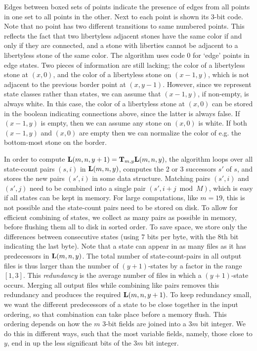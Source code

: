 \documentclass{article}
\begin{document}
Edges between boxed sets of points indicate the presence of edges from all
points in one set to all points in the other.
Next to each point is shown its 3-bit code. Note that no point
has two different transitions to same numbered points. 
This reflects the fact that two libertyless adjacent stones have the same
color if and only if they are connected, and a stone with liberties cannot
be adjacent to a libertyless stone of the same color.
The algorithm uses code 0 for `edge' points in edge states.
Two pieces of information are still lacking; the color of a libertyless
stone at $(x,0)$, and the color of a libertyless stone on $(x-1,y)$, which
is not adjacent to the previous border point at $(x,y-1)$.
However, since we represent state classes rather than states, we can
assume that $(x-1,y)$, if non-empty, is always white.
In this case, the color of a libertyless stone at $(x,0)$ can be stored
in the boolean indicating connections above, since the latter is always false.
If $(x-1,y)$ is empty, then we can assume any stone on $(x,0)$ is white.
If both $(x-1,y)$ and $(x,0)$ are empty then we can normalize
the color of e.g. the bottom-most stone on the border.

In order to compute $\mathbf{L}(m,n,y+1) = \mathbf{T}_{m,y} \mathbf{L}(m,n,y)$,
the algorithm loops over all state-count pairs $(s,i)$ in $\mathbf{L}(m,n,y)$,
computes the 2 or 3 successors $s'$ of $s$, and stores the new pairs
$(s',i)$ in some data structure.
Matching pairs $(s',i)$ and $(s',j)$ need to be combined into a single
pair $(s',i+j \bmod M)$, which is easy if all states can be kept in memory.
For large computations, like $m=19$, this is not possible and the
state-count pairs need to be stored on disk. To allow for efficient combining
of states, we collect as many pairs as possible in memory, before flushing
them all to disk in sorted order. To save space, we store only the differences
between consecutive states (using 7 bits per byte, with
the 8th bit indicating the last byte).
Note that a state can appear in as many files as it has
predecessors in $\mathbf{L}(m,n,y)$.
The total number of state-count-pairs in all output files is thus
larger than the number of $(y+1)$-states by a factor in the range $[1,3]$.
This {\em redundancy} is the average number of files in which
a $(y+1)$-state occurs. Merging all output files while combining like pairs
removes this redundancy and produces the required $\mathbf{L}(m,n,y+1)$.
To keep redundancy small, we want
the different predecessors of a state to be close together
in the input ordering, so that combination can take place before
a memory flush.
This ordering depends on how the $m$ 3-bit fields are joined into a
$3m$ bit integer. We do this in different ways, such that the most variable
fields, namely, those close to $y$, end in up the less significant
bits of the $3m$ bit integer.
\end{document}
